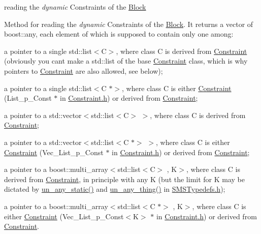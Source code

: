 reading the {\itshape dynamic} Constraints of the \mbox{\hyperlink{class_s_m_spp__di__unipi__it_1_1_block}{Block}} 

Method for reading the {\itshape dynamic} Constraints of the \mbox{\hyperlink{class_s_m_spp__di__unipi__it_1_1_block}{Block}}. It returns a vector of boost\+::any, each element of which is supposed to contain only one among\+:


\begin{DoxyItemize}
\item a pointer to a single std\+::list$<$\+C$>$, where class C is derived from \mbox{\hyperlink{class_s_m_spp__di__unipi__it_1_1_constraint}{Constraint}} (obviously you can\textquotesingle{}t make a std\+::list of the base \mbox{\hyperlink{class_s_m_spp__di__unipi__it_1_1_constraint}{Constraint}} class, which is why pointers to \mbox{\hyperlink{class_s_m_spp__di__unipi__it_1_1_constraint}{Constraint}} are also allowed, see below);
\item a pointer to a single std\+::list$<$\+C $\ast$$>$, where class C is either \mbox{\hyperlink{class_s_m_spp__di__unipi__it_1_1_constraint}{Constraint}} (List\+\_\+p\+\_\+\+Const $\ast$ in \mbox{\hyperlink{_constraint_8h}{Constraint.\+h}}) or derived from \mbox{\hyperlink{class_s_m_spp__di__unipi__it_1_1_constraint}{Constraint}};
\item a pointer to a std\+::vector$<$std\+::list$<$\+C$>$ $>$, where class C is derived from \mbox{\hyperlink{class_s_m_spp__di__unipi__it_1_1_constraint}{Constraint}};
\item a pointer to a std\+::vector$<$std\+::list$<$\+C $\ast$$>$ $>$, where class C is either \mbox{\hyperlink{class_s_m_spp__di__unipi__it_1_1_constraint}{Constraint}} (Vec\+\_\+\+List\+\_\+p\+\_\+\+Const $\ast$ in \mbox{\hyperlink{_constraint_8h}{Constraint.\+h}}) or derived from \mbox{\hyperlink{class_s_m_spp__di__unipi__it_1_1_constraint}{Constraint}};
\item a pointer to a boost\+::multi\+\_\+array$<$std\+::list$<$\+C$>$ , K$>$, where class C is derived from \mbox{\hyperlink{class_s_m_spp__di__unipi__it_1_1_constraint}{Constraint}}, in principle with any K (but the limit for K may be dictated by \mbox{\hyperlink{group__boost__any__stuff_ga8ec1a694aa7a5fa58ab801c1ea419fa8}{un\+\_\+any\+\_\+static()}} and \mbox{\hyperlink{group__boost__any__stuff_gab299af634bc1ca9be3a8d45a14560036}{un\+\_\+any\+\_\+thing()}} in \mbox{\hyperlink{_s_m_s_typedefs_8h}{S\+M\+S\+Typedefs.\+h}});
\item a pointer to a boost\+::multi\+\_\+array$<$std\+::list$<$\+C $\ast$$>$ , K$>$, where class C is either \mbox{\hyperlink{class_s_m_spp__di__unipi__it_1_1_constraint}{Constraint}} (Vec\+\_\+\+List\+\_\+p\+\_\+\+Const$<$\+K$>$ $\ast$ in \mbox{\hyperlink{_constraint_8h}{Constraint.\+h}}) or derived from \mbox{\hyperlink{class_s_m_spp__di__unipi__it_1_1_constraint}{Constraint}}.
\end{DoxyItemize}

